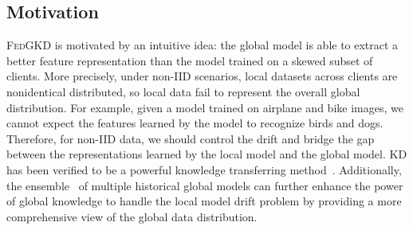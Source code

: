 \documentclass{article} %
\newcommand{\w}{\boldsymbol{w}}
\newcommand{\system}{\textsc{FedGKD}\xspace}
\begin{document}
\subsection{Motivation}
\system is motivated by an intuitive idea: the global model is able to extract a better feature representation than the model trained on a skewed subset of clients.
More precisely, under non-IID scenarios, local datasets across clients are nonidentical distributed, so local data fail to represent the overall global distribution. For example, given a model trained on airplane and bike images, we cannot expect the features learned by the model to recognize birds and dogs. Therefore, for non-IID data, we should control the drift and bridge the gap between the representations learned by the local model and the global model. KD has been verified to be a powerful knowledge transferring method~\citep{hinton2015distilling}. Additionally, the ensemble~\citep{PolyakEnsemble} of multiple historical global models can further enhance the power of global knowledge to handle the local model drift problem by providing a more comprehensive view of the global data distribution.


	
\end{document}
